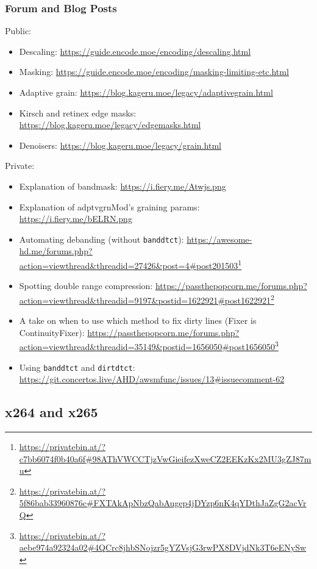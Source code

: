 \documentclass{scrartcl}
\begin{document}
\subsubsection{Forum and Blog Posts}\label{posts}
Public:
\begin{itemize}
\item Descaling: \url{https://guide.encode.moe/encoding/descaling.html}
\item Masking: \url{https://guide.encode.moe/encoding/masking-limiting-etc.html}
\item Adaptive grain: \url{https://blog.kageru.moe/legacy/adaptivegrain.html}
\item Kirsch and retinex edge masks: \url{https://blog.kageru.moe/legacy/edgemasks.html}
\item Denoisers: \url{https://blog.kageru.moe/legacy/grain.html}
\end{itemize}
Private:
\begin{itemize}
\item Explanation of bandmask: \url{https://i.fiery.me/Atwjs.png}
\item Explanation of adptvgrnMod's graining params: \url{https://i.fiery.me/bELRN.png}
\item Automating debanding (without \texttt{banddtct}): \url{https://awesome-hd.me/forums.php?action=viewthread&threadid=27426&post=4#post201503}\footnote{\url{https://privatebin.at/?c7bb6074f0b40a6f\#98AThVWCCTjzVwGieifezXweCZ2EEKzKx2MU3gZJ87mu}}
\item Spotting double range compression: \url{https://passthepopcorn.me/forums.php?action=viewthread&threadid=9197&postid=1622921#post1622921}\footnote{\url{https://privatebin.at/?5f86bab33960876c\#FXTAkApNbzQabAugep4jDYzp6nK4qYDthJaZgG2acVrQ}}
\item A take on when to use which method to fix dirty lines (Fixer is ContinuityFixer): \url{https://passthepopcorn.me/forums.php?action=viewthread&threadid=35149&postid=1656050#post1656050}\footnote{\url{https://privatebin.at/?aebe974a92324a02\#4QCrc8jhbSNojzr5gYZVsjG3rwPX8DVjdNk3T6eENySw}}
\item Using \texttt{banddtct} and \texttt{dirtdtct}: \url{https://git.concertos.live/AHD/awsmfunc/issues/13#issuecomment-62}
\end{itemize}

\subsection{x264 and x265}
\end{document}
